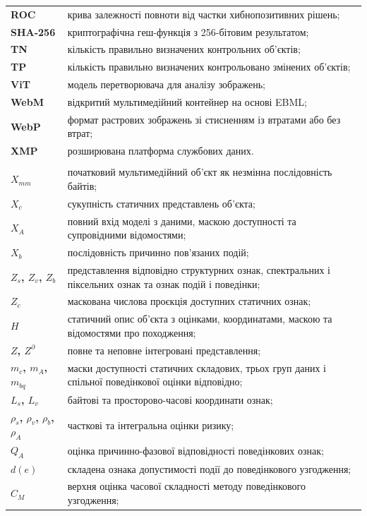 \begin{longtable}{>{\bfseries}p{}p{}}
ROC & крива залежності повноти від частки хибнопозитивних рішень;\\
SHA-256 & криптографічна геш-функція з 256-бітовим результатом;\\
TN & кількість правильно визначених контрольних об’єктів;\\
TP & кількість правильно визначених контрольовано змінених об’єктів;\\
ViT & модель перетворювача для аналізу зображень;\\
WebM & відкритий мультимедійний контейнер на основі EBML;\\
WebP & формат растрових зображень зі стисненням із втратами або без втрат;\\
XMP & розширювана платформа службових даних.\\
\addlinespace
\multicolumn{2}{l}{\textbf{Основні математичні символи}}\\
$X_{mm}$ & початковий мультимедійний об’єкт як незмінна послідовність байтів;\\
$X_c$ & сукупність статичних представлень об’єкта;\\
$X_A$ & повний вхід моделі з даними, маскою доступності та супровідними відомостями;\\
$X_b$ & послідовність причинно пов’язаних подій;\\
$Z_s$, $Z_v$, $Z_b$ & представлення відповідно структурних ознак, спектральних і піксельних ознак та ознак подій і поведінки;\\
$Z_c$ & маскована числова проєкція доступних статичних ознак;\\
$H$ & статичний опис об’єкта з оцінками, координатами, маскою та відомостями про походження;\\
$Z$, $Z^{\partial}$ & повне та неповне інтегровані представлення;\\
$m_c$, $m_A$, $m_{bq}$ & маски доступності статичних складових, трьох груп даних і спільної поведінкової оцінки відповідно;\\
$L_s$, $L_v$ & байтові та просторово-часові координати ознак;\\
$\rho_s$, $\rho_v$, $\rho_b$, $\rho_A$ & часткові та інтегральна оцінки ризику;\\
$Q_A$ & оцінка причинно-фазової відповідності поведінкових ознак;\\
$d(e)$ & складена ознака допустимості події до поведінкового узгодження;\\
$C_M$ & верхня оцінка часової складності методу поведінкового узгодження;\\

\end{longtable}
